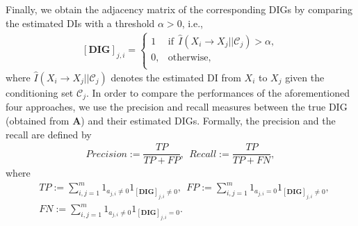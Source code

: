 Finally, we obtain the adjacency matrix of the corresponding DIGs by comparing the estimated DIs with a threshold $\alpha>0$, i.e., 
\begin{align}\label{eq:m}
    [\textbf{DIG}]_{j,i}=\left\{
\begin{array}{ll}
      1  & \text{if}\ \ \widehat{I}(X_i\rightarrow X_j||\mathcal{C}_j)>\alpha, \\
      0,  & \text{otherwise}, \\
\end{array} 
\right.
\end{align}
where $\widehat{I}(X_i\rightarrow X_j||\mathcal{C}_j)$ denotes the estimated DI from $X_i$ to $X_j$ given the conditioning set $\mathcal{C}_j$. 
In order to compare the performances of the aforementioned four approaches, we use the precision and recall measures between the true DIG (obtained from $\textbf{A}$) and their estimated DIGs. 
Formally, the precision and the recall are defined by
\begin{align*}
    Precision:= \dfrac{TP}{TP+FP}, \ \ Recall:= \dfrac{TP}{TP+FN},
\end{align*}
where 
\begin{align*}
    & TP := \sum_{i,j=1}^m 1_{a_{j,i} \neq 0}1_{ [\textbf{DIG}]_{j,i} \neq 0}, \ \ FP := \sum_{i,j=1}^m 1_{a_{j,i} = 0}1_{ [\textbf{DIG}]_{j,i} \neq 0},\\
    & FN := \sum_{i,j=1}^m 1_{a_{j,i} \neq 0}1_{ [\textbf{DIG}]_{j,i} = 0}.
\end{align*}

    
